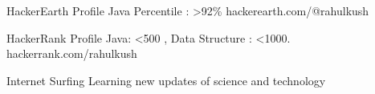 

\begin{cvhonors}

  \cvhonor
    {HackerEarth Profile} %
    {Java Percentile : >92\%} %
    {hackerearth.com/@rahulkush} %
    {} %
    
  \cvhonor
    {HackerRank Profile} %
    {Java: <500 , Data Structure : <1000.} %
    {hackerrank.com/rahulkush} %
    {} %

  \cvhonor
    {Internet Surfing} %
    {Learning new updates of science and technology} %
    {} %
    {} %

\end{cvhonors}
